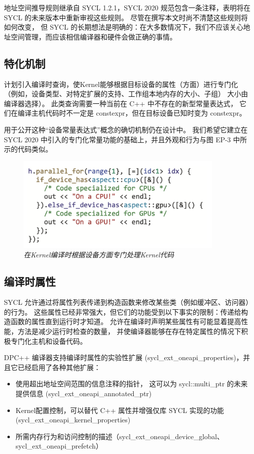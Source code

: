 地址空间推导规则继承自 SYCL 1.2.1，SYCL 2020 规范包含一条注释，表明将在 SYCL 的未来版本中重新审视这些规则。 
尽管在撰写本文时尚不清楚这些规则将如何改变，
但 SYCL 的长期想法是明确的：在大多数情况下，我们不应该关心地址空间管理，而应该相信编译器和硬件会做正确的事情。

\subsection{特化机制}
计划引入编译时查询，使Kernel能够根据目标设备的属性（方面）进行专门化
（例如，设备类型、对特定扩展的支持、工作组本地内存的大小、子组） 大小由编译器选择）。 
此类查询需要一种当前在 C++ 中不存在的新型常量表达式，
它们在编译主机代码时不一定是 constexpr，但在目标设备已知时变为 constexpr。

用于公开这种“设备常量表达式”概念的确切机制仍在设计中。 
我们希望它建立在 SYCL 2020 中引入的专门化常量功能的基础上，并且外观和行为与图 EP-3 中所示的代码类似。

\begin{figure}[H]
	\centering
	\includegraphics[width=0.9\textwidth]{figs/F22.3.png}
	\caption{\textit{在Kernel编译时根据设备方面专门处理Kernel代码 }}
\end{figure}

\subsection{编译时属性}
SYCL 允许通过将属性列表传递到构造函数来修改某些类（例如缓冲区、访问器）的行为。 
这些属性已经非常强大，但它们的功能受到以下事实的限制：传递给构造函数的属性直到运行时才知道。 
允许在编译时声明某些属性有可能显着提高性能，方法是减少运行时检查的数量，
并使编译器能够在存在特定属性的情况下积极专门化主机和设备代码。

DPC++ 编译器支持编译时属性的实验性扩展 (sycl\_ext\_oneapi\_properties)，并且它已经启用了各种其他扩展：

\begin{itemize}
	\item 使用超出地址空间范围的信息注释的指针，
	这可以为 sycl::multi\_ptr 的未来提供信息 (sycl\_ext\_oneapi\_annotated\_ptr)

	\item Kernel配置控制，可以替代 C++ 属性并增强仅库 SYCL 实现的功能 (sycl\_ext\_oneapi\_kernel\_properties)

	\item 所需内存行为和访问控制的描述（sycl\_ext\_oneapi\_device\_global、sycl\_ext\_oneapi\_prefetch）
\end{itemize}

